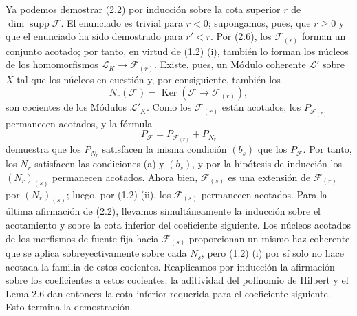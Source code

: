 Ya podemos demostrar (2.2) por inducción sobre la cota superior $r$ de
$\dim\operatorname{supp}\mathcal F$. El enunciado es trivial para $r<0$;
supongamos, pues, que $r\geq0$ y que el enunciado ha sido demostrado para
$r'<r$. Por (2.6), los $\mathcal F_{(r)}$ forman un conjunto acotado; por
tanto, en virtud de (1.2) (i), también lo forman los núcleos de los
homomorfismos $\mathcal L_K\longrightarrow\mathcal F_{(r)}$. Existe, pues, un
Módulo coherente $\mathcal L'$ sobre $X$ tal que los núcleos en cuestión y,
por consiguiente, también los
\[
N_r(\mathcal F)=\operatorname{Ker}(\mathcal F\longrightarrow\mathcal F_{(r)}),
\]
son cocientes de los Módulos $\mathcal L'_K$. Como los
$\mathcal F_{(r)}$ están acotados, los $P_{\mathcal F_{(r)}}$ permanecen
acotados, y la fórmula
\[
P_{\mathcal F}=P_{\mathcal F_{(r)}}+P_{N_r}
\]
demuestra que los $P_{N_r}$ satisfacen la misma condición $(b_s)$ que los
$P_{\mathcal F}$. Por tanto, los $N_r$ satisfacen las condiciones (a) y
$(b_s)$, y por la hipótesis de inducción los $(N_r)_{(s)}$ permanecen acotados.
Ahora bien, $\mathcal F_{(s)}$ es una extensión de $\mathcal F_{(r)}$ por
$(N_r)_{(s)}$; luego, por (1.2) (ii), los $\mathcal F_{(s)}$ permanecen
acotados. Para la última afirmación de (2.2), llevamos simultáneamente la inducción sobre el acotamiento y sobre la cota inferior del coeficiente siguiente. Los núcleos acotados de los morfismos de fuente fija hacia $\mathcal F_{(s)}$ proporcionan un mismo haz coherente que se aplica sobreyectivamente sobre cada $N_s$, pero (1.2) (i) por sí solo no hace acotada la familia de estos cocientes. Reaplicamos por inducción la afirmación sobre los coeficientes a estos cocientes; la aditividad del polinomio de Hilbert y el Lema 2.6 dan entonces la cota inferior requerida para el coeficiente siguiente. Esto termina la demostración.


